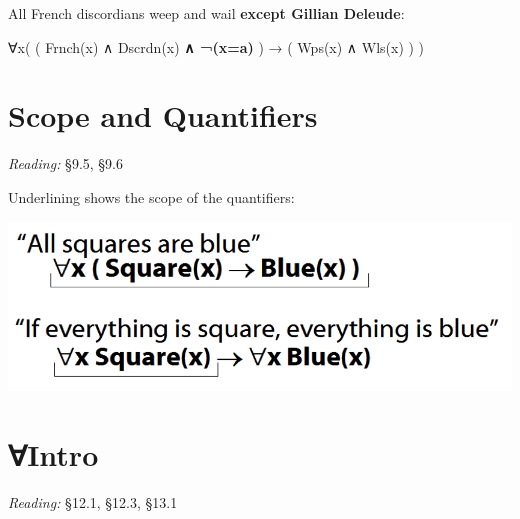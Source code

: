 \documentclass[12pt]{extarticle}
\begin{document}
\begin{multicols*}{3}
\begin{minipage}{\columnwidth}
\end{minipage}
 
\begin{minipage}{\columnwidth}
 
All French discordians weep and wail \textbf{except Gillian Deleude}:
 
∀x( ( Frnch(x) ∧ Dscrdn(x) \textbf{∧ ¬(x=a)} ) → ( Wps(x) ∧ Wls(x) ) )
 
\end{minipage}
 
 
 
\section{Scope and Quantifiers}
 
\emph{Reading:} §9.5, §9.6
 
\begin{minipage}{\columnwidth}
 
Underlining shows the scope of the quantifiers:
 
\begin{center}
\includegraphics[scale=0.3]{img/scope_quantifiers.png}
\end{center}
\end{minipage}
 
 
 
\section{∀Intro}
 
\emph{Reading:} §12.1, §12.3, §13.1
 

\end{multicols*}
\end{document}
